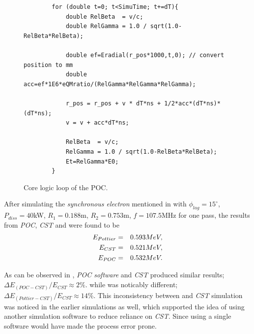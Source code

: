 \documentclass[a4paper,oneside,12pt]{report}
\numberwithin{equation}{chapter}
\begin{document}
\begin{figure}[H]
    \begin{verbatim}
        for (double t=0; t<SimuTime; t+=dT){
            double RelBeta  = v/c;
            double RelGamma = 1.0 / sqrt(1.0-RelBeta*RelBeta);
        
            double ef=Eradial(r_pos*1000,t,0); // convert position to mm
            double acc=ef*1E6*eQMratio/(RelGamma*RelGamma*RelGamma); 
        
            r_pos = r_pos + v * dT*ns + 1/2*acc*(dT*ns)*(dT*ns);
            v = v + acc*dT*ns;

            RelBeta  = v/c;
            RelGamma = 1.0 / sqrt(1.0-RelBeta*RelBeta);
            Et=RelGamma*E0; 
        }
    \end{verbatim}
    \vspace{20pt}
    \caption{Core logic loop of the POC.}
    \label{fig:POC_core_logic}
\end{figure}

After simulating the \textit{synchronous electron} mentioned in  
with $\phi_{lag}=15^\circ$, $P_{diss}=40$kW, $R_1=0.188$m, $R_2=0.753$m, $f=107.5$MHz for one pass, 
the results from \textit{POC}, \textit{CST} and  were found to be
\vspace{-10pt}\begin{eqnarray}
    E_{Pottier} &=& 0.593 MeV  , \\
    E_{CST} &=& 0.521 MeV  ,  \label{eq:poc_E_results}\\
    E_{POC} &=& 0.532 MeV . 
\vspace{-20pt}\end{eqnarray}

As can be observed in , \textit{POC software} and \textit{CST} produced similar results; $\Delta E_{(POC-CST)}/E_{CST} \approx 2\%$.
while  was noticably different; $\Delta E_{(Pottier-CST)}/E_{CST} \approx 14\%$.
This inconsistency between  and  \textit{CST} simulation was noticed in the earlier simulations as well, which supported the idea of using another simulation software to reduce reliance on \textit{CST}.
Since using a single software would have made the process error prone.
\end{document}
